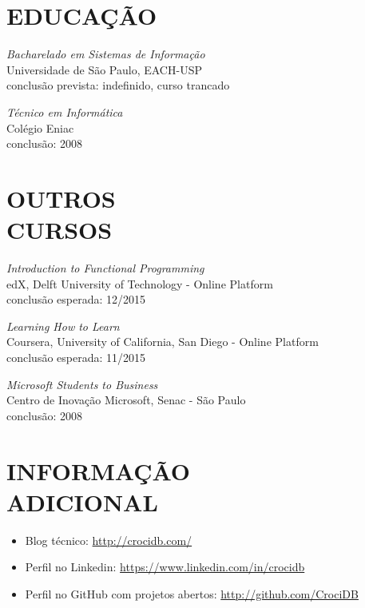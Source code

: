 \documentclass[line,margin]{res}
\begin{document}
\begin{resume}
 
\section{EDUCAÇÃO} {\sl Bacharelado em Sistemas de Informação} \\
                Universidade de São Paulo, EACH-USP \\
                conclusão prevista: indefinido, curso trancado
                
                {\sl Técnico em Informática} \\
                Colégio Eniac \\
                conclusão: 2008 \\

\section{OUTROS \\ CURSOS}     
            {\sl Introduction to Functional Programming} \\
            edX, Delft University of Technology - Online Platform \\
            conclusão esperada: 12/2015

           {\sl Learning How to Learn} \\
            Coursera, University of California, San Diego - Online Platform\\
            conclusão esperada: 11/2015

           {\sl Microsoft Students to Business} \\
                Centro de Inovação Microsoft, Senac - São Paulo \\
                conclusão: 2008 

\section{INFORMAÇÃO \\ ADICIONAL}
            \begin{itemize}  \itemsep 1pt
            \item Blog técnico: \href{http://crocidb.com/}{http://crocidb.com/}
            \item Perfil no Linkedin: \href{https://www.linkedin.com/in/crocidb}{https://www.linkedin.com/in/crocidb}
            \item Perfil no GitHub com projetos abertos: \href{http://github.com/CrociDB}{http://github.com/CrociDB}
            \end{itemize} 

\end{resume}
\end{document}
